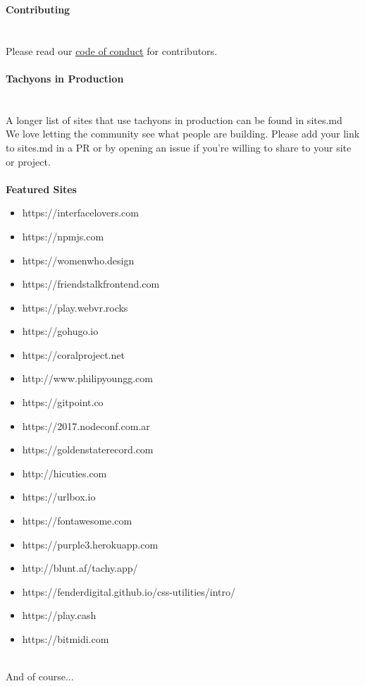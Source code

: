 \documentclass{article}
\begin{document}
{\noindent \LARGE \textbf{Contributing}}\\\\
\\
Please read our \href{https://github.com/tachyons-css/tachyons/blob/master/code-of-conduct.md}{code of conduct} for contributors.\\
\\
{\noindent \LARGE \textbf{Tachyons in Production}}\\\\
\\
A longer list of sites that use tachyons in production can be found in sites.md\\
We love letting the community see what people are building. Please add your link to sites.md in a PR or by opening an issue if you're willing to share to your site or project.\\
\\
\textbf{Featured Sites}\\
\begin{itemize}
	\item https://interfacelovers.com
	\item https://npmjs.com
	\item https://womenwho.design
	\item https://friendstalkfrontend.com
	\item https://play.webvr.rocks
	\item https://gohugo.io
	\item https://coralproject.net
	\item http://www.philipyoungg.com
	\item https://gitpoint.co
	\item https://2017.nodeconf.com.ar
	\item https://goldenstaterecord.com
	\item http://hicuties.com
	\item https://urlbox.io
	\item https://fontawesome.com
	\item https://purple3.herokuapp.com
	\item http://blunt.af/tachy.app/
	\item https://fenderdigital.github.io/css-utilities/intro/
	\item https://play.cash
	\item https://bitmidi.com
\end{itemize}
\\
And of course...\\
\end{document}
